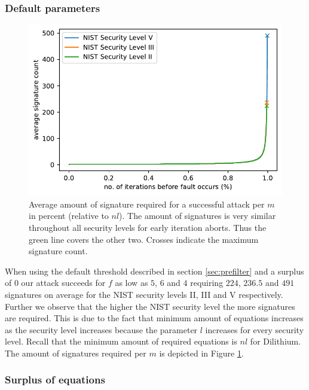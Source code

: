 \subsubsection{Default parameters}
\label{sec:min_sig_amount}

\begin{figure}
	\centering
	\includegraphics[width=.7\linewidth]{plots/dilithium_sigcount_noparams}
	\caption{Average amount of signature required for a successful attack per $m$ in percent (relative to $nl$). The amount of signatures is very similar throughout all security levels for early iteration aborts. Thus the green line covers the other two. Crosses indicate the maximum signature count.}
	\label{fig:dilithiumsigcountnoparams}
\end{figure} 

When using the default threshold described in section \ref{sec:prefilter} and a surplus of $0$ our attack succeeds for $f$ as low as $5$, $6$ and $4$ requiring $224$, $236.5$ and $491$ signatures on average for the NIST security levels II, III and V respectively.
Further we observe that the higher the NIST security level the more signatures are required. This is due to the fact that minimum amount of equations increases as the security level increases  because the parameter $l$ increases for every security level.  Recall that the minimum amount of required equations is $nl$ for Dilithium. The amount of signatures required per $m$ is depicted in Figure \ref{fig:dilithiumsigcountnoparams}.

\subsubsection{Surplus of equations}
\label{sec:dilithiumsurplus}

